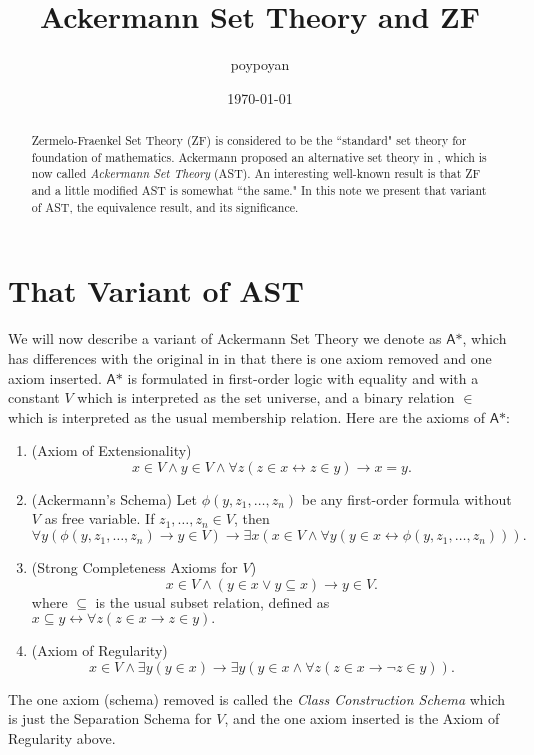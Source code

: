 \documentclass{article}
\title{Ackermann Set Theory and ZF}
\author{poypoyan}
\date{\petsa\today}
\begin{document}
\maketitle

\begin{abstract}
Zermelo-Fraenkel Set Theory (ZF) is considered to be the ``standard" set theory for foundation of mathematics. Ackermann proposed an alternative set theory in \cite{ackermann}, which is now called \textit{Ackermann Set Theory} (AST). An interesting well-known result is that ZF and a little modified AST is somewhat ``the same." In this note we present that variant of AST, the equivalence result, and its significance.
\end{abstract}

\section{That Variant of AST}
We will now describe a variant of Ackermann Set Theory we denote as $\textsf{A*}$, which has differences with the original in \cite{ackermann} in that there is one axiom removed and one axiom inserted. $\textsf{A*}$ is formulated in first-order logic with equality and with a constant $V$ which is interpreted as the set universe, and a binary relation $\in$ which is interpreted as the usual membership relation. Here are the axioms of $\textsf{A*}$:
\begin{enumerate}
	\item (Axiom of Extensionality) $$x \in V \wedge y \in V \wedge \forall z(z\in x \leftrightarrow z \in y) \rightarrow x = y.$$
	\item (Ackermann's Schema) Let $\phi(y, z_1, \ldots, z_n)$ be any first-order formula without $V$ as free variable. If $z_1, \ldots, z_n \in V$, then $$\forall y(\phi(y, z_1, \ldots, z_n) \rightarrow y \in V) \rightarrow \exists x(x \in V \wedge \forall y(y \in x \leftrightarrow \phi(y, z_1, \ldots, z_n))).$$
	\item (Strong Completeness Axioms for $V$) $$x \in V \wedge (y \in x \vee y \subseteq x) \rightarrow y \in V.$$ where $\subseteq$ is the usual subset relation, defined as $x \subseteq y \leftrightarrow \forall z(z \in x \rightarrow z \in y).$
	\item (Axiom of Regularity) $$x \in V \wedge \exists y(y \in x) \rightarrow \exists y(y \in x \wedge \forall z(z \in x \rightarrow \neg z \in y)).$$
\end{enumerate}
The one axiom (schema) removed is called the \textit{Class Construction Schema} which is just the Separation Schema for $V$, and the one axiom inserted is the Axiom of Regularity above.
\end{document}
